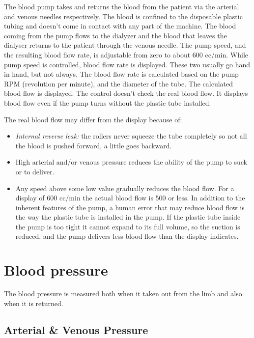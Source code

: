\documentclass[
  11pt,
  letterpaper,
  DIV=11,
  numbers=noendperiod]{scrreprt}
\providecommand{\tightlist}{%
  \setlength{\itemsep}{0pt}\setlength{\parskip}{0pt}}\usepackage{longtable,booktabs,array}
\begin{document}
The blood pump takes and returns the blood from the patient via the
arterial and venous needles respectively. The blood is confined to the
disposable plastic tubing and doesn't come in contact with any part of
the machine. The blood coming from the pump flows to the dialyzer and
the blood that leaves the dialyser returns to the patient through the
venous needle. The pump speed, and the resulting blood flow rate, is
adjustable from zero to about 600 cc/min. While pump speed is
controlled, blood flow rate is displayed. These two usually go hand in
hand, but not always. The blood flow rate is calculated based on the
pump RPM (revolution per minute), and the diameter of the tube. The
calculated blood flow is displayed. The control doesn't check the real
blood flow. It displays blood flow even if the pump turns without the
plastic tube installed.

The real blood flow may differ from the display because of:

\begin{itemize}
\tightlist
\item
  \emph{Internal reverse leak:} the rollers never squeeze the tube
  completely so not all the blood is pushed forward, a little goes
  backward.
\item
  High arterial and/or venous pressure reduces the ability of the pump
  to suck or to deliver.
\item
  Any speed above some low value gradually reduces the blood flow. For a
  display of 600 cc/min the actual blood flow is 500 or less. In
  addition to the inherent features of the pump, a human error that may
  reduce blood flow is the way the plastic tube is installed in the
  pump. If the plastic tube inside the pump is too tight it cannot
  expand to its full volume, so the suction is reduced, and the pump
  delivers less blood flow than the display indicates.
\end{itemize}

\section{Blood pressure}\label{blood-pressure}

The blood pressure is measured both when it taken out from the limb and
also when it is returned.

\subsection{Arterial \& Venous Pressure}\label{arterial-venous-pressure}
\end{document}
